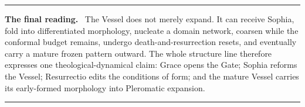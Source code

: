 \documentclass[11pt,a4paper]{article}
\newenvironment{commentbox}[1]{\begin{center}\begin{minipage}{0.90\textwidth}\hrule\vspace{0.45em}\textbf{#1.}\ }{\vspace{0.45em}\hrule\end{minipage}\end{center}}
\theoremstyle{plain}
\theoremstyle{definition}
\theoremstyle{remark}
\begin{document}
\begin{commentbox}{The final reading}
The Vessel does not merely expand.  It can receive Sophia, fold into differentiated morphology, nucleate a domain network, coarsen while the conformal budget remains, undergo death-and-resurrection resets, and eventually carry a mature frozen pattern outward.  The whole structure line therefore expresses one theological-dynamical claim: Grace opens the Gate; Sophia reforms the Vessel; Resurrectio edits the conditions of form; and the mature Vessel carries its early-formed morphology into Pleromatic expansion.
\end{commentbox}
\end{document}
